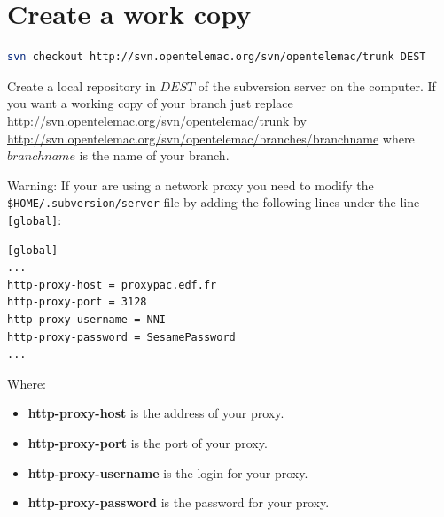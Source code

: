 \section{Create a work copy}
%
%
\begin{lstlisting}[language=bash]
svn checkout http://svn.opentelemac.org/svn/opentelemac/trunk DEST
\end{lstlisting}
Create a local repository in $DEST$ of the subversion server on the computer.
If you want a working copy of your branch just replace
\url{http://svn.opentelemac.org/svn/opentelemac/trunk} by
\url{http://svn.opentelemac.org/svn/opentelemac/branches/branchname} where
$branchname$ is the name of your branch.\\
%
\begin{WarningBlock}{Warning:}
If your are using a network proxy you need to modify the \verb"$HOME/.subversion/server"
file by adding the following lines under the line \verb"[global]":
\begin{lstlisting}[language=bash]
[global]
...
http-proxy-host = proxypac.edf.fr 
http-proxy-port = 3128
http-proxy-username = NNI	
http-proxy-password = SesamePassword
...
\end{lstlisting}
Where:
\begin{itemize}
\item \textbf{http-proxy-host} is the address of your proxy.
\item \textbf{http-proxy-port} is the port of your proxy.
\item \textbf{http-proxy-username} is the login for your proxy.
\item \textbf{http-proxy-password} is the password for your proxy.
\end{itemize}
\end{WarningBlock}
%
%
